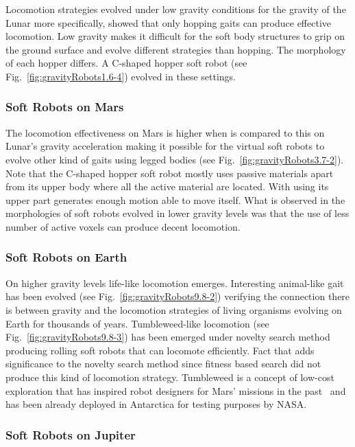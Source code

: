 \documentclass{sig-alternate}
\begin{document}
Locomotion strategies evolved under low gravity conditions for the gravity of the Lunar more specifically, showed that only hopping gaits can produce effective locomotion. Low gravity makes it difficult for the soft body structures to grip on the ground surface and evolve different strategies than hopping. The morphology of each hopper differs. A C-shaped hopper soft robot (see Fig.~\ref{fig:gravityRobots1.6-4}) evolved in these settings.

\subsubsection*{Soft Robots on Mars}

The locomotion effectiveness on Mars is higher when is compared to this on Lunar's gravity acceleration making it possible for the virtual soft robots to evolve other kind of gaits using legged bodies (see Fig.~\ref{fig:gravityRobots3.7-2}). Note that the C-shaped hopper soft robot mostly uses passive materials apart from its upper body where all the active material are located. With using its upper part generates enough motion able to move itself. What is observed in the morphologies of soft robots evolved in lower gravity levels was that the use of less number of active voxels can produce decent locomotion.

\subsubsection*{Soft Robots on Earth}

On higher gravity levels life-like locomotion emerges. Interesting animal-like gait has been evolved (see Fig.~\ref{fig:gravityRobots9.8-2}) verifying the connection there is between gravity and the locomotion strategies of living organisms evolving on Earth for thousands of years. Tumbleweed-like locomotion (see Fig.~\ref{fig:gravityRobots9.8-3}) has been emerged under novelty search method producing rolling soft robots that can locomote efficiently. Fact that adds significance to the novelty search method since fitness based search did not produce this kind of locomotion strategy. Tumbleweed is a concept of low-cost exploration that has inspired robot designers for Mars' missions in the past~\cite{antol2003low} and has been already deployed in Antarctica for testing purposes by NASA.

\subsubsection*{Soft Robots on Jupiter}
\end{document}
